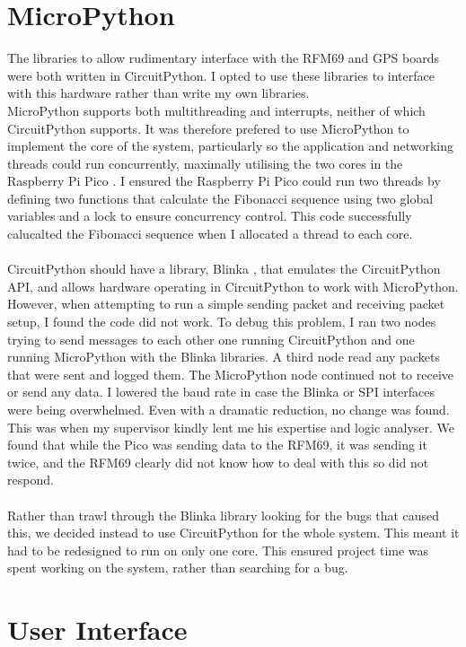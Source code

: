 \documentclass[12pt,a4paper]{report}
\begin{document}
\section{MicroPython}
The libraries to allow rudimentary interface with the RFM69 and GPS boards were both written in CircuitPython. I opted to use these libraries to interface with this hardware rather than write my own libraries. \\ 
MicroPython supports both multithreading and interrupts, neither of which CircuitPython supports. It was therefore prefered to use MicroPython to implement the core of the system, particularly so the application and networking threads could run concurrently, maximally utilising the two cores in the Raspberry Pi Pico \cite{rp2040}. I ensured the Raspberry Pi Pico could run two threads by defining two functions that calculate the Fibonacci sequence using two global variables and a lock to ensure concurrency control. This code successfully calucalted the Fibonacci sequence when I allocated a thread to each core. \\ \\ 
CircuitPython should have a library, Blinka \cite{blinka}, that emulates the CircuitPython API, and allows hardware operating in CircuitPython to work with MicroPython. However, when attempting to run a simple sending packet and receiving packet setup, I found the code did not work. To debug this problem, I ran two nodes trying to send messages to each other one running CircuitPython and one running MicroPython with the Blinka libraries. A third node read any packets that were sent and logged them. The MicroPython node continued not to receive or send any data. I lowered the baud rate in case the Blinka or SPI interfaces were being overwhelmed. Even with a dramatic reduction, no change was found. \\
This was when my supervisor kindly lent me his expertise and logic analyser. We found that while the Pico was sending data to the RFM69, it was sending it twice, and the RFM69 clearly did not know how to deal with this so did not respond. \\ \\
Rather than trawl through the Blinka library looking for the bugs that caused this, we decided instead to use CircuitPython for the whole system. This meant it had to be redesigned to run on only one core. This ensured project time was spent working on the system, rather than searching for a bug. 


\section{User Interface}
\end{document}
